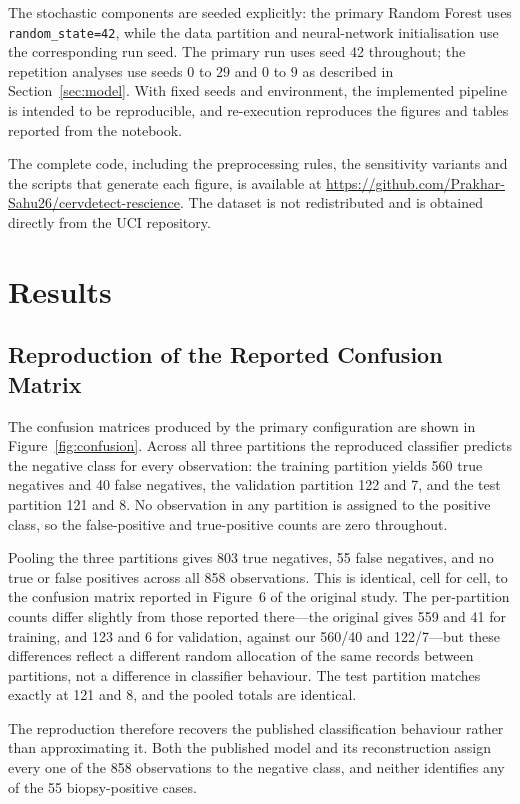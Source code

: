 The stochastic components are seeded explicitly: the primary Random Forest uses
\texttt{random\_state=42}, while the data partition and neural-network
initialisation use the corresponding run seed. The primary run uses seed 42
throughout; the repetition analyses use seeds $0$ to $29$ and $0$ to $9$ as
described in Section~\ref{sec:model}. With fixed seeds and environment, the
implemented pipeline is intended to be reproducible, and re-execution
reproduces the figures and tables reported from the notebook.

The complete code, including the preprocessing rules, the sensitivity variants
and the scripts that generate each figure, is available at
\url{https://github.com/Prakhar-Sahu26/cervdetect-rescience}. The dataset is
not redistributed and is obtained directly from the UCI repository.

\section{Results}\label{sec:results}

\subsection{Reproduction of the Reported Confusion Matrix}\label{sec:cm}

The confusion matrices produced by the primary configuration are shown in
Figure~\ref{fig:confusion}. Across all three partitions the reproduced
classifier predicts the negative class for every observation: the training
partition yields 560 true negatives and 40 false negatives, the validation
partition 122 and 7, and the test partition 121 and 8. No observation in any
partition is assigned to the positive class, so the false-positive and
true-positive counts are zero throughout.

Pooling the three partitions gives 803 true negatives, 55 false negatives, and
no true or false positives across all 858 observations. This is identical, cell
for cell, to the confusion matrix reported in Figure~6 of the original study.
The per-partition counts differ slightly from those reported there---the
original gives 559 and 41 for training, and 123 and 6 for validation, against
our 560/40 and 122/7---but these differences reflect a different random
allocation of the same records between partitions, not a difference in
classifier behaviour. The test partition matches exactly at 121 and 8, and the
pooled totals are identical.

The reproduction therefore recovers the published classification behaviour
rather than approximating it. Both the published model and its reconstruction
assign every one of the 858 observations to the negative class, and neither
identifies any of the 55 biopsy-positive cases.

